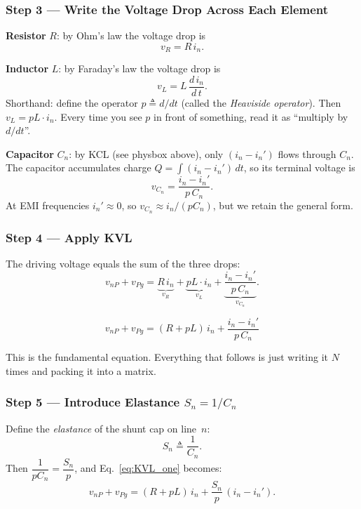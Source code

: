 \subsubsection*{Step 3 — Write the Voltage Drop Across Each Element}

\textbf{Resistor} $R$: by Ohm's law the voltage drop is
\[
    v_R = R\, i_n.
\]

\textbf{Inductor} $L$: by Faraday's law the voltage drop is
\[
    v_L = L\,\frac{d\,i_n}{d\,t}.
\]
Shorthand: define the operator $p \triangleq d/dt$
(called the \emph{Heaviside operator}).  Then
$v_L = pL\cdot i_n$.  Every time you see $p$ in front of
something, read it as ``multiply by $d/dt$''.

\textbf{Capacitor} $C_n$: by KCL (see physbox above), only
$(i_n - i_n')$ flows through $C_n$.  The capacitor accumulates
charge $Q = \int (i_n - i_n')\,dt$, so its terminal voltage is
\[
    v_{C_n} = \frac{i_n - i_n'}{p\,C_n}.
\]
At EMI frequencies $i_n' \approx 0$, so $v_{C_n} \approx i_n/(pC_n)$,
but we retain the general form.

\subsubsection*{Step 4 — Apply KVL}

The driving voltage equals the sum of the three drops:
\[
    v_{nP} + v_{Pg}
    = \underbrace{R\,i_n}_{v_R}
    + \underbrace{pL\cdot i_n}_{v_L}
    + \underbrace{\dfrac{i_n - i_n'}{p\,C_n}}_{v_{C_n}}.
\]

\begin{eqnbox}
\begin{equation}
    v_{nP} + v_{Pg}
    = (R + pL)\,i_n + \frac{i_n - i_n'}{p\,C_n}
    \label{eq:KVL_one}
\end{equation}
\end{eqnbox}

This is the fundamental equation.  Everything that follows is just
writing it $N$ times and packing it into a matrix.

\subsubsection*{Step 5 — Introduce Elastance $S_n = 1/C_n$}

Define the \emph{elastance} of the shunt cap on line~$n$:
\[
    S_n \triangleq \frac{1}{C_n}.
\]
Then $\dfrac{1}{pC_n} = \dfrac{S_n}{p}$, and
Eq.~\eqref{eq:KVL_one} becomes:
\[
    v_{nP} + v_{Pg}
    = (R + pL)\,i_n + \frac{S_n}{p}\,(i_n - i_n').
\]

